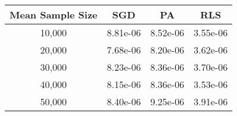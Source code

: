 \begin{tabular}{cccc}
\toprule
Mean Sample Size &       SGD &        PA &       RLS \\
\midrule
          10,000 &  8.81e-06 &  8.52e-06 &  3.55e-06 \\
          20,000 &  7.68e-06 &  8.20e-06 &  3.62e-06 \\
          30,000 &  8.23e-06 &  8.36e-06 &  3.70e-06 \\
          40,000 &  8.15e-06 &  8.36e-06 &  3.53e-06 \\
          50,000 &  8.40e-06 &  9.25e-06 &  3.91e-06 \\
\bottomrule
\end{tabular}
